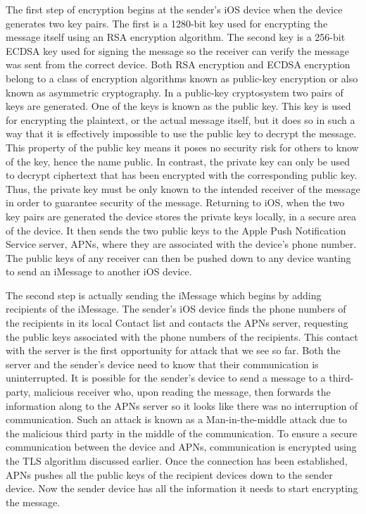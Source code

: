 The first step of encryption begins at the sender's iOS device when the device
generates two key pairs.  The first is a 1280-bit key used for encrypting the
message itself using an RSA encryption algorithm.  The second key is a 256-bit
ECDSA key used for signing the message so the receiver can verify the message
was sent from the correct device.  Both RSA encryption and ECDSA encryption
belong to a class of encryption algorithms known as public-key encryption or
also known as asymmetric cryptography. In a public-key cryptosystem two pairs
of keys are generated.  One of the keys is known as the public key.  This key
is used for encrypting the plaintext, or the actual message itself, but it does
so in such a way that it is effectively impossible to use the public key to
decrypt the message.  This property of the public key means it poses no
security risk for others to know of the key, hence the name public.  In
contrast, the private key can only be used to decrypt ciphertext that has been
encrypted with the corresponding public key.  Thus, the private key must be
only known to the intended receiver of the message in order to guarantee
security of the message.  Returning to iOS, when the two key pairs are
generated the device stores the private keys locally, in a secure area of the
device.  It then sends the two public keys to the Apple Push Notification
Service server, APNs, where they are associated with the device's phone number.
The public keys of any receiver can then be pushed down to any device wanting
to send an iMessage to another iOS device.

The second step is actually sending the iMessage which begins by adding
recipients of the iMessage.  The sender's iOS device finds the phone numbers of
the recipients in its local Contact list and contacts the APNs server,
requesting the public keys associated with the phone numbers of the recipients.
This contact with the server is the first opportunity for attack that we see so
far.  Both the server and the sender's device need to know that their
communication is uninterrupted.  It is possible for the sender's device to send
a message to a third-party, malicious receiver who, upon reading the message,
then forwards the information along to the APNs server so it looks like there
was no interruption of communication.  Such an attack is known as a
Man-in-the-middle attack due to the malicious third party in the middle of the
communication.  To ensure a secure communication between the device and APNs,
communication is encrypted using the TLS algorithm discussed earlier.  Once the
connection has been established, APNs pushes all the public keys of the
recipient devices down to the sender device.  Now the sender device has all the
information it needs to start encrypting the message.

